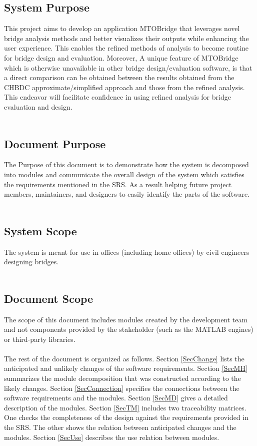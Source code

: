 \documentclass[12pt, titlepage]{article}
\begin{document}
\subsection{System Purpose}
This project aims to develop an application MTOBridge that leverages novel bridge analysis methods and better visualizes their outputs while enhancing the user experience.
This enables the refined methods of analysis to become routine for bridge design and evaluation. Moreover, A unique feature of MTOBridge which is otherwise unavailable in other
bridge design/evaluation software, is that a direct comparison can be obtained between the results obtained from the CHBDC approximate/simplified approach and those from the
refined analysis. This endeavor will facilitate confidence in using refined analysis for bridge evaluation and design.\\\\
\subsection{Document Purpose}
The Purpose of this document is to demonstrate how the system is decomposed into modules and communicate the overall design of the system which satisfies the requirements
 mentioned in the SRS. As a result helping future project members, maintainers, and designers to easily identify the parts of the software.\\\\
\subsection{System Scope}
The system is meant for use in offices (including home offices) by civil engineers designing bridges.\\\\
\subsection{Document Scope}
The scope of this document includes modules created by the development team and not components provided by the stakeholder (such as the MATLAB engines) 
or third-party libraries.\\\\ 


The rest of the document is organized as follows. Section
\ref{SecChange} lists the anticipated and unlikely changes of the software
requirements. Section \ref{SecMH} summarizes the module decomposition that
was constructed according to the likely changes. Section \ref{SecConnection}
specifies the connections between the software requirements and the
modules. Section \ref{SecMD} gives a detailed description of the
modules. Section \ref{SecTM} includes two traceability matrices. One checks
the completeness of the design against the requirements provided in the SRS. The
other shows the relation between anticipated changes and the modules. Section
\ref{SecUse} describes the use relation between modules.
\end{document}
